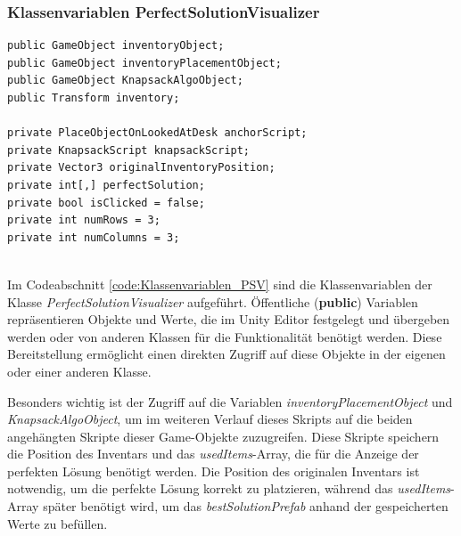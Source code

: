 \subsubsection{Klassenvariablen PerfectSolutionVisualizer}
\begin{lstlisting}[style=csharp, caption={Klassenvariablen des PerfectSolutionVisualizer}, label=code:Klassenvariablen_PSV]
public GameObject inventoryObject;
public GameObject inventoryPlacementObject;
public GameObject KnapsackAlgoObject;
public Transform inventory;

private PlaceObjectOnLookedAtDesk anchorScript;
private KnapsackScript knapsackScript;
private Vector3 originalInventoryPosition;
private int[,] perfectSolution;
private bool isClicked = false;
private int numRows = 3;
private int numColumns = 3;
\end{lstlisting}\\
Im Codeabschnitt \ref{code:Klassenvariablen_PSV} sind die Klassenvariablen der Klasse \textit{PerfectSolutionVisualizer}
aufgeführt. Öffentliche (\textbf{public}) Variablen repräsentieren Objekte und Werte, die im Unity Editor festgelegt und
übergeben werden oder von anderen Klassen für die Funktionalität benötigt werden. Diese Bereitstellung ermöglicht einen
direkten Zugriff auf diese Objekte in der eigenen oder einer anderen Klasse.

Besonders wichtig ist der Zugriff auf die Variablen \textit{inventoryPlacementObject} und \textit{KnapsackAlgoObject},
um im weiteren Verlauf dieses Skripts auf die beiden angehängten Skripte dieser Game-Objekte zuzugreifen. Diese Skripte
speichern die Position des Inventars und das \textit{usedItems}-Array, die für die Anzeige der perfekten Lösung benötigt
werden. Die Position des originalen Inventars ist notwendig, um die perfekte Lösung korrekt zu platzieren, während das
\textit{usedItems}-Array später benötigt wird, um das \textit{bestSolutionPrefab} anhand der gespeicherten Werte zu befüllen.

